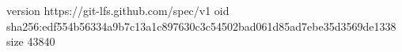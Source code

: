 version https://git-lfs.github.com/spec/v1
oid sha256:edf554b56334a9b7c13a1c897630c3c54502bad061d85ad7ebe35d3569de1338
size 43840
